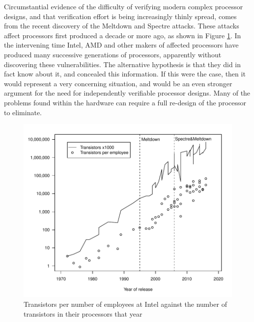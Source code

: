 Circumstantial evidence of the difficulty of verifying modern complex processor designs, and that verification effort is being increasingly thinly spread, comes from the recent discovery of the Meltdown and Spectre attacks.
These attacks affect processors first produced a decade or more ago, as shown in Figure \ref{fig:transistor_graph}.
In the intervening time Intel, AMD and other makers of affected processors have produced many successive generations of processors, apparently without discovering these vulnerabilities.
The alternative hypothesis is that they did in fact know about it, and concealed this information.
If this were the case, then it would represent a very concerning situation, and would be an even stronger argument for the need for independently verifiable processor designs.
Many of the problems found within the hardware can require a full re-design of the processor to eliminate.

\begin{figure}
	\includegraphics[width=\linewidth]{cpu-complexity/cpucomplexity.pdf}
	\caption{Transistors per number of employees at Intel against the number of transistors in their processors that year \cite{RN22, RN23, RN24, RN25, RN26}}
	\label{fig:transistor_graph}
\end{figure}



